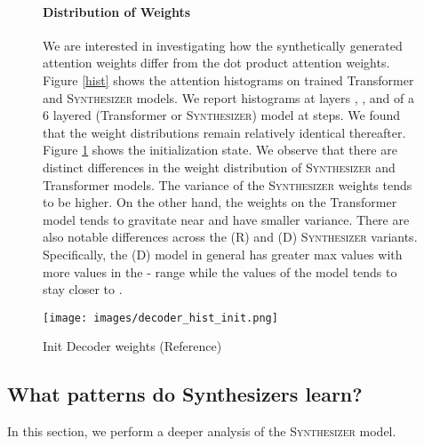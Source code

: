 \documentclass{article} \usepackage{iclr2021_conference,times}
\begin{document}
\begin{figure}[H]
\begin{minipage}{0.70\linewidth}
\paragraph{Distribution of Weights} We are interested in investigating how the synthetically generated attention weights differ from the dot product attention weights. Figure \ref{hist} shows the attention histograms on trained Transformer and \textsc{Synthesizer} models. We report histograms at layers , , and  of a 6 layered (Transformer or \textsc{Synthesizer}) model at  steps. We found that the weight distributions remain relatively identical thereafter. Figure \ref{fig:init} shows the initialization state. We observe that there are distinct differences in the weight distribution of \textsc{Synthesizer} and Transformer models. The variance of the \textsc{Synthesizer} weights tends to be higher. On the other hand, the weights on the Transformer model tends to gravitate near  and have smaller variance. There are also notable differences across the (R) and (D) \textsc{Synthesizer} variants. Specifically, the (D) model in general has greater max values with more values in the - range while the values of the  model tends to stay closer to .
\end{minipage}\hfill
\begin{minipage}{0.25\linewidth}
 \centering
     \texttt{[image: images/decoder\_hist\_init.png]}
    \caption{Init Decoder weights (Reference)}
    \label{fig:init}
\end{minipage}\hfill 
\end{figure}

\subsection{What patterns do Synthesizers learn?}
In this section, we perform a deeper analysis of the \textsc{Synthesizer} model.
\end{document}
